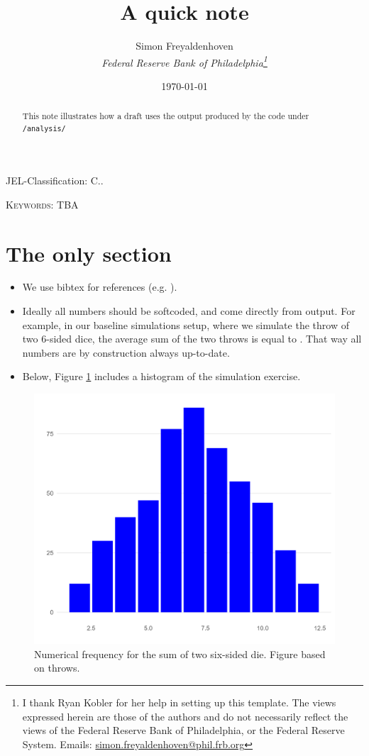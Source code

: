 \documentclass[12pt]{article}
\author{
        Simon Freyaldenhoven\\
        \textit{Federal Reserve Bank of Philadelphia\thanks{I thank Ryan Kobler for her help in setting up this template. The views expressed herein are those of the authors and do not necessarily reflect the views of the Federal Reserve Bank of Philadelphia, or the Federal Reserve System. Emails: \href{mailto:simon.freyaldenhoven@phil.frb.org}{simon.freyaldenhoven@phil.frb.org}}}
}
\title{A quick note}
\date{\today}
\theoremstyle{definition}
\begin{document}
\maketitle

\begin{abstract}
\noindent This note illustrates how a draft uses the output produced by the code under \texttt{/analysis/}
\end{abstract}

JEL-Classification: C..

\textsc{Keywords}: TBA

\thispagestyle{empty}
\newpage

\setcounter{page}{1}

\section{The only section}

\begin{itemize}
\item We use bibtex for references (e.g. \cite{Freyaldenhoven2019}). 

\item Ideally all numbers should be softcoded, and come directly from output. For example, in our baseline simulations setup, where we simulate the throw of two 6-sided dice, the average sum of the two throws is equal to \unskip. That way all numbers are by construction always up-to-date.

\item Below, Figure \ref{fig:hist_baseline} includes a histogram of the simulation exercise.
\end{itemize}
\begin{figure}[tbh!]
\centering
\includegraphics[width=.8\linewidth]{plot/baseline/hist.png}
\caption[]{Numerical frequency for the sum of two six-sided die. Figure based on throws.}
\label{fig:hist_baseline}
\end{figure}
\end{document}
